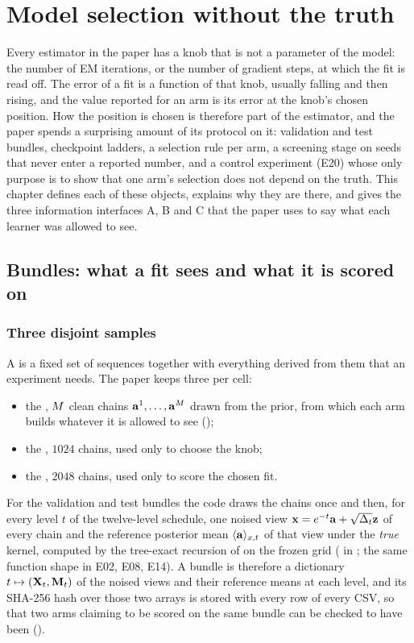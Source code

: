 \chapter{Model selection without the truth}
\label{ch:model-selection}

Every estimator in the paper has a knob that is not a parameter of the model: the
number of EM iterations, or the number of gradient steps, at which the fit is read off.
The error of a fit is a function of that knob, usually falling and then rising, and the
value reported for an arm is its error at the knob's chosen position. How the position
is chosen is therefore part of the estimator, and the paper spends a surprising amount
of its protocol on it: validation and test bundles, checkpoint ladders, a selection
rule per arm, a screening stage on seeds that never enter a reported number, and a
control experiment (E20) whose only purpose is to show that one arm's selection does
not depend on the truth. This chapter defines each of these objects, explains why they
are there, and gives the three information interfaces A, B and C that the paper uses to
say what each learner was allowed to see.

\section{Bundles: what a fit sees and what it is scored on}
\label{sec:bundles}

\subsection{Three disjoint samples}

A  is a fixed set of sequences together with everything derived from them
that an experiment needs. The paper keeps three per cell:
\begin{itemize}
\item the , $M$ clean chains $\mathbf{a}^1,\dots,\mathbf{a}^{M}$ drawn from
  the prior, from which each arm builds whatever it is allowed to see ();
\item the , $1024$ chains, used only to choose the knob;
\item the , $2048$ chains, used only to score the chosen fit.
\end{itemize}
For the validation and test bundles the code draws the chains once and then, for every
level $t$ of the twelve-level schedule, one noised view $\mathbf{x}=e^{-t}\mathbf{a}+\sqrt{\Delta_t}\mathbf{z}$ of
every chain and the reference posterior mean $\langle \mathbf{a} \rangle_{x,t}$ of that view under the
\emph{true} kernel, computed by the tree-exact recursion of 
on the frozen grid ( in ; the same
function shape in E02, E08, E14). A bundle is therefore a dictionary
$t\mapsto(\mathbf{X}_t,\mathbf{M}_t)$ of the noised views and their reference means at each
level, and its SHA-256 hash over those two arrays is stored with every row of every CSV,
so that two arms claiming to be scored on the same bundle can be checked to have been
().

